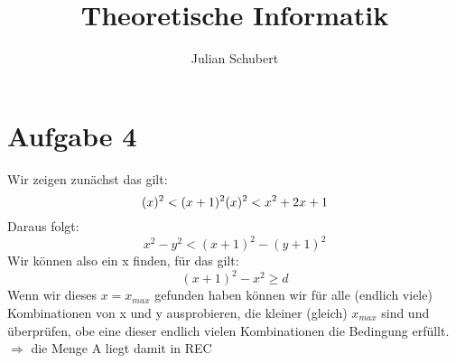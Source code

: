 \documentclass[14pt]{article}
\title{Theoretische Informatik}
\author{Julian Schubert}
\begin{document}
\section*{Aufgabe 4}
Wir zeigen zunächst das gilt:
\[
    (x)^2 < (x + 1)^2  \\
    (x)^2 < x^2 + 2x + 1
\]
Daraus folgt: \\
\[
    x^2 - y^2 < (x + 1)^2 - (y + 1)^2  
\]
Wir können also ein x finden, für das gilt:
\[
    (x + 1)^2 - x^2 \geq d
\]
Wenn wir dieses $x = x_{max}$ gefunden haben können wir für alle (endlich viele)
Kombinationen von x und y ausprobieren, die kleiner (gleich) $x_{max}$ sind
und überprüfen, obe eine dieser endlich vielen Kombinationen die Bedingung
erfüllt. \\
$\Rightarrow$ die Menge A liegt damit in REC
\end{document}
